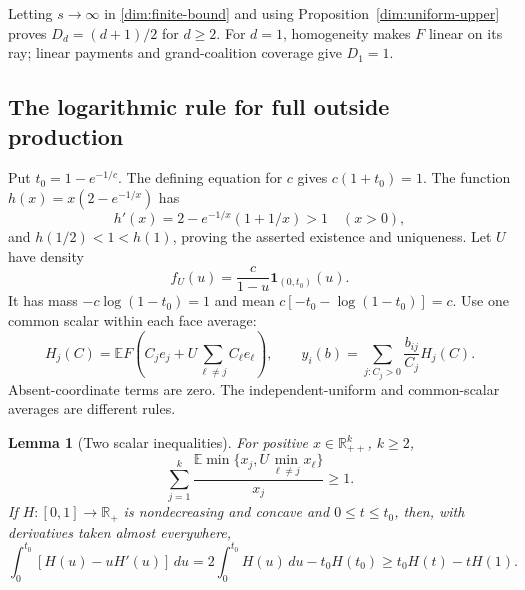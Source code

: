 \documentclass[11pt]{article}
\newcommand{\R}{\mathbb R}
\newcommand{\E}{\mathbb E}
\newcommand{\ind}{\mathbf1}
\newtheorem{lemma}[theorem]{Lemma}
\theoremstyle{definition}\newtheorem{definition}[theorem]{Definition}
\theoremstyle{remark}\newtheorem{remark}[theorem]{Remark}
\begin{document}
Letting $s\to\infty$ in \eqref{dim:finite-bound} and using
Proposition~\ref{dim:uniform-upper} proves $D_d=(d+1)/2$ for $d\ge2$.
For $d=1$, homogeneity makes $F$ linear on its ray; linear payments and
grand-coalition coverage give $D_1=1$.

\subsection{The logarithmic rule for full outside production}

Put $t_0=1-e^{-1/c}$. The defining equation for $c$ gives
$c(1+t_0)=1$. The function $h(x)=x(2-e^{-1/x})$ has
\[
 h'(x)=2-e^{-1/x}(1+1/x)>1\quad(x>0),
\]
and $h(1/2)<1<h(1)$, proving the asserted existence and uniqueness.
Let $U$ have density
\begin{equation}\label{dim:log-law}
 f_U(u)=\frac{c}{1-u}\ind_{(0,t_0)}(u).
\end{equation}
It has mass $-c\log(1-t_0)=1$ and mean
$c[-t_0-\log(1-t_0)]=c$.
Use one common scalar within each face average:
\begin{equation}\label{dim:log-rule}
 H_j(C)=\E F\left(C_je_j+U\sum_{\ell\ne j}C_\ell e_\ell\right),
 \qquad y_i(b)=\sum_{j:C_j>0}\frac{b_{ij}}{C_j}H_j(C).
\end{equation}
Absent-coordinate terms are zero. The independent-uniform and common-scalar
averages are different rules.

\begin{lemma}[Two scalar inequalities]\label{dim:scalar}
For positive $x\in\R_{++}^k$, $k\ge2$,
\begin{equation}\label{dim:ray-lemma}
 \sum_{j=1}^k\frac{\E\min\{x_j,U\min_{\ell\ne j}x_\ell\}}{x_j}\ge1.
\end{equation}
If $H:[0,1]\to\R_+$ is nondecreasing and concave and $0\le t\le t_0$,
then, with derivatives taken almost everywhere,
\begin{equation}\label{dim:hinge-lemma}
 \int_0^{t_0}[H(u)-uH'(u)]\,du
 =2\int_0^{t_0}H(u)\,du-t_0H(t_0)
 \ge t_0H(t)-tH(1).
\end{equation}
\end{lemma}
\end{document}

